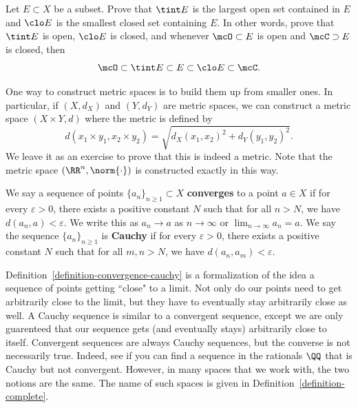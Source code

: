 \documentclass[11pt]{article}
\begin{document}
    \begin{prop}
        Let $E \subset X$ be a subset. Prove that $\tint E$ is the largest open set contained in $E$ and $\clo E$ is the smallest closed set containing $E$. In other words, prove that $\tint E$ is open, $\clo E$ is closed, and whenever $\mcO \subset E$ is open and $\mcC \supset E$ is closed, then 
        \[
            \mcO \subset \tint E \subset E \subset \clo E \subset \mcC.
        \]
    \end{prop}

    One way to construct metric spaces is to build them up from smaller ones. In particular, if $(X, d_X)$ and $(Y, d_Y)$ are metric spaces, we can construct a metric space $(X \times Y, d)$ where the metric is defined by 
    \[
        d ( x_1 \times y_1, x_2 \times y_2) = \sqrt{d_X(x_1, x_2)^2 + d_Y(y_1, y_2)^2}.
    \] 
    We leave it as an exercise to prove that this is indeed a metric. Note that the metric space $(\RR^n, \norm{\cdot})$ is constructed exactly in this way. 

    \begin{defn} \label{definition-convergence-cauchy}
        We say a sequence of points $\{a_n\}_{n\geq 1} \subset X$ \textbf{converges} to a point $a \in X$ if for every $\varepsilon > 0$, there exists a positive constant $N$ such that for all $n > N$, we have $d(a_n, a) < \varepsilon$. We write this as $a_n \to a$ as $n \to \infty$ or $\lim_{n \to \infty} a_n = a$. We say the sequence $\{a_n\}_{n \geq 1}$ is \textbf{Cauchy} if for every $\varepsilon > 0$, there exists a positive constant $N$ such that for all $m, n > N$, we have $d(a_n, a_m) < \varepsilon$.  
    \end{defn}

    Definition~\ref{definition-convergence-cauchy} is a formalization of the idea a sequence of points getting ``close" to a limit. Not only do our points need to get arbitrarily close to the limit, but they have to eventually stay arbitrarily close as well. A Cauchy sequence is similar to a convergent sequence, except we are only guarenteed that our sequence gets (and eventually stays) arbitrarily close to itself. Convergent sequences are always Cauchy sequences, but the converse is not necessarily true. Indeed, see if you can find a sequence in the rationals $\QQ$ that is Cauchy but not convergent. However, in many spaces that we work with, the two notions are the same. The name of such spaces is given in Definition~\ref{definition-complete}.
\end{document}
